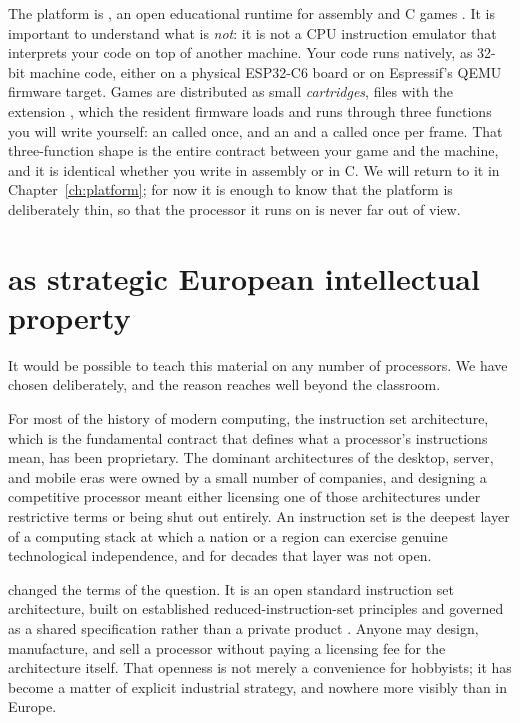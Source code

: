 The platform is \prg, an open educational runtime for \riscv assembly and C games
\citep{prg32repo}. It is important to understand what \prg is \emph{not}: it is
not a CPU instruction emulator that interprets your code on top of another
machine. Your code runs natively, as 32-bit \riscv machine code, either on a
physical ESP32\nobreakdash-C6 board or on Espressif's QEMU firmware target. Games are
distributed as small \emph{cartridges}, files with the extension ,
which the resident firmware loads and runs through three functions you will write
yourself: an  called once, and an  and a 
called once per frame. That three-function shape is the entire contract between
your game and the machine, and it is identical whether you write in assembly or
in C. We will return to it in Chapter~\ref{ch:platform}; for now it is enough to
know that the platform is deliberately thin, so that the processor it runs on is
never far out of view.

\section[RISC-V as strategic European intellectual property]{\riscv as strategic European intellectual property}

It would be possible to teach this material on any number of processors. We have
chosen \riscv deliberately, and the reason reaches well beyond the classroom.

For most of the history of modern computing, the instruction set architecture, which is
the fundamental contract that defines what a processor's instructions mean, has
been proprietary. The dominant architectures of the desktop, server, and mobile
eras were owned by a small number of companies, and designing a competitive
processor meant either licensing one of those architectures under restrictive
terms or being shut out entirely. An instruction set is the deepest layer of a
computing stack at which a nation or a region can exercise genuine technological
independence, and for decades that layer was not open.

\riscv changed the terms of the question. It is an open standard instruction set
architecture, built on established reduced-instruction-set principles and
governed as a shared specification rather than a private product
\citep{riscvisa}. Anyone may design, manufacture, and sell a \riscv processor
without paying a licensing fee for the architecture itself. That openness is not
merely a convenience for hobbyists; it has become a matter of explicit industrial
strategy, and nowhere more visibly than in Europe.

